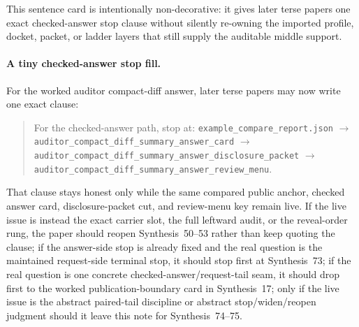 \documentclass[11pt]{article}
\begin{document}
This sentence card is intentionally non-decorative: it gives later terse papers one exact checked-answer stop clause without silently re-owning the imported profile, docket, packet, or ladder layers that still supply the auditable middle support.\cite{series:workedexample}

\paragraph{A tiny checked-answer stop fill.}
For the worked auditor compact-diff answer, later terse papers may now write one exact clause:
\begin{quote}\small
For the checked-answer path, stop at: \nolinkurl{example_compare_report.json} $\to$ \nolinkurl{auditor_compact_diff_summary_answer_card} $\to$ \nolinkurl{auditor_compact_diff_summary_answer_disclosure_packet} $\to$ \nolinkurl{auditor_compact_diff_summary_answer_review_menu}.
\end{quote}
That clause stays honest only while the same compared public anchor, checked answer card, disclosure-packet cut, and review-menu key remain live. If the live issue is instead the exact carrier slot, the full leftward audit, or the reveal-order rung, the paper should reopen Synthesis~50--53 rather than keep quoting the clause; if the answer-side stop is already fixed and the real question is the maintained request-side terminal stop, it should stop first at Synthesis~73; if the real question is one concrete checked-answer/request-tail seam, it should drop first to the worked publication-boundary card in Synthesis~17; only if the live issue is the abstract paired-tail discipline or abstract stop/widen/reopen judgment should it leave this note for Synthesis~74--75.\cite{series:workedexample}
\end{document}
